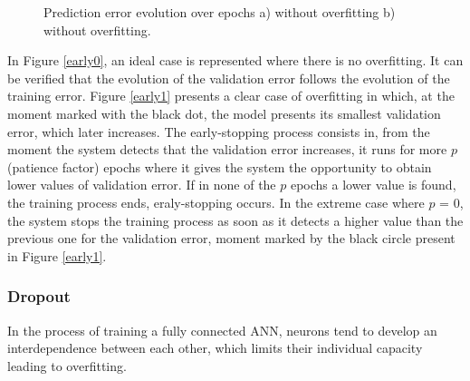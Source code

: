 \begin{figure}[h!]
\captionsetup[subfigure]{position=b}
\centering
{}
\hspace{0.05\textwidth}
\caption{Prediction error evolution over epochs a) without overfitting b) without overfitting.}
\label{early}
\end{figure}

In Figure \ref{early0}, an ideal case is represented where there is no overfitting. It can be verified that the evolution of the validation error follows the evolution of the training error. Figure \ref{early1} presents a clear case of overfitting in which, at the moment marked with the black dot, the model presents its smallest validation error, which later increases. The early-stopping process consists in, from the moment the system detects that the validation error increases, it runs for more $p$ (patience factor) epochs where it gives the system the opportunity to obtain lower values of validation error. If in none of the $p$ epochs a lower value is found, the training process ends, eraly-stopping occurs. In the extreme case where $p$ = 0, the system stops the training process as soon as it detects a higher value than the previous one for the validation error, moment marked by the black circle present in Figure \ref{early1}.


\subsubsection{Dropout}

In the process of training a fully connected \ac{ANN}, neurons tend to develop an interdependence between each other, which limits their individual capacity leading to overfitting.


